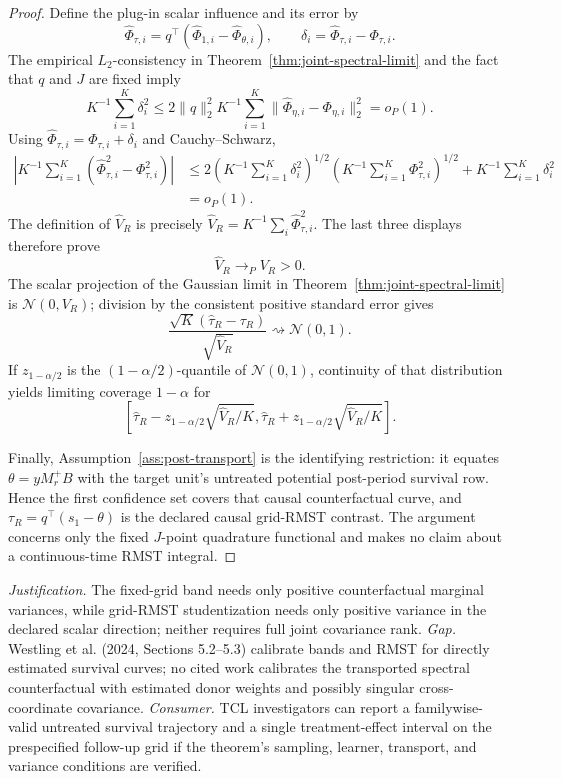 \documentclass{article}
\begin{document}
\begin{proof}
Define the plug-in scalar influence and its error by
\[
 \widehat\Phi_{\tau,i}
 =q^\top(\widehat\Phi_{1,i}-\widehat\Phi_{\theta,i}),
 \qquad
 \delta_i=\widehat\Phi_{\tau,i}-\Phi_{\tau,i}.
\]
The empirical \(L_2\)-consistency in Theorem~\ref{thm:joint-spectral-limit} and the fact that \(q\) and \(J\) are fixed imply
\[
 K^{-1}\sum_{i=1}^K\delta_i^2
 \le 2\|q\|_2^2 K^{-1}\sum_{i=1}^K
 \|\widehat\Phi_{\eta,i}-\Phi_{\eta,i}\|_2^2
 =o_P(1).
\]
Using \(\widehat\Phi_{\tau,i}=\Phi_{\tau,i}+\delta_i\) and Cauchy--Schwarz,
\[
\begin{aligned}
 \left|K^{-1}\sum_{i=1}^K
   (\widehat\Phi_{\tau,i}^2-\Phi_{\tau,i}^2)\right|
 &\le 2\left(K^{-1}\sum_{i=1}^K\delta_i^2\right)^{1/2}
          \left(K^{-1}\sum_{i=1}^K\Phi_{\tau,i}^2\right)^{1/2}
       +K^{-1}\sum_{i=1}^K\delta_i^2\\
 &=o_P(1).
\end{aligned}
\]
The definition of \(\widehat V_R\) is precisely
\(\widehat V_R=K^{-1}\sum_i\widehat\Phi_{\tau,i}^2\).  The last three displays therefore prove
\[
 \widehat V_R\longrightarrow_PV_R>0.
\]
The scalar projection of the Gaussian limit in Theorem~\ref{thm:joint-spectral-limit} is \(\mathcal N(0,V_R)\); division by the consistent positive standard error gives
\[
 \frac{\sqrt K(\widehat\tau_R-\tau_R)}{\sqrt{\widehat V_R}}
 \rightsquigarrow\mathcal N(0,1).
\]
If \(z_{1-\alpha/2}\) is the \((1-\alpha/2)\)-quantile of \(\mathcal N(0,1)\), continuity of that distribution yields limiting coverage \(1-\alpha\) for
\[
 \left[
 \widehat\tau_R-z_{1-\alpha/2}\sqrt{\widehat V_R/K},
 \widehat\tau_R+z_{1-\alpha/2}\sqrt{\widehat V_R/K}
 \right].
\]

Finally, Assumption~\ref{ass:post-transport} is the identifying restriction: it equates \(\theta=yM_r^+B\) with the target unit's untreated potential post-period survival row.  Hence the first confidence set covers that causal counterfactual curve, and \(\tau_R=q^\top(s_1-\theta)\) is the declared causal grid-RMST contrast.  The argument concerns only the fixed \(J\)-point quadrature functional and makes no claim about a continuous-time RMST integral.
\end{proof}
\par\smallskip\noindent \textit{Justification.} The fixed-grid band needs only positive counterfactual marginal variances, while grid-RMST studentization needs only positive variance in the declared scalar direction; neither requires full joint covariance rank. \textit{Gap.} Westling et al. (2024, Sections 5.2--5.3) calibrate bands and RMST for directly estimated survival curves; no cited work calibrates the transported spectral counterfactual with estimated donor weights and possibly singular cross-coordinate covariance. \textit{Consumer.} TCL investigators can report a familywise-valid untreated survival trajectory and a single treatment-effect interval on the prespecified follow-up grid if the theorem's sampling, learner, transport, and variance conditions are verified.
\end{document}
